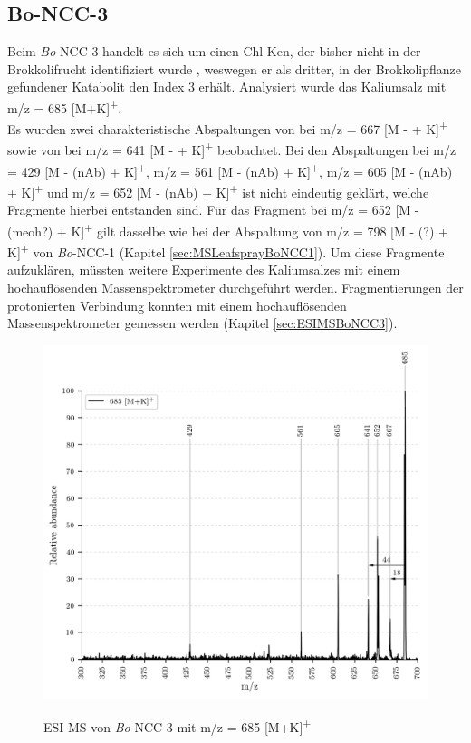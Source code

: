 \subsection{Bo-NCC-3}

Beim \textit{Bo}-NCC-3 handelt es sich um einen \gls{Chl-K}en, der bisher nicht in der Brokkolifrucht identifiziert wurde \cite{ChlorophyllCatabolitesBroccoli}, weswegen er als dritter, in der Brokkolipflanze gefundener Katabolit den Index 3 erhält. Analysiert wurde das Kaliumsalz mit m/z = 685 [M+K]\textsuperscript{+}. \\

Es wurden zwei charakteristische Abspaltungen von  bei m/z = 667 [M -  + K]\textsuperscript{+} sowie von  bei m/z = 641 [M -  + K]\textsuperscript{+} beobachtet. Bei den Abspaltungen bei m/z = 429 [M - (\gls{nAb}) + K]\textsuperscript{+}, m/z = 561 [M - (\gls{nAb}) + K]\textsuperscript{+}, m/z = 605 [M - (\gls{nAb}) + K]\textsuperscript{+} und m/z = 652 [M - (\gls{nAb}) + K]\textsuperscript{+} ist nicht eindeutig geklärt, welche Fragmente hierbei entstanden sind. Für das Fragment bei m/z = 652 [M - (\gls{meoh}?) + K]\textsuperscript{+} gilt dasselbe wie bei der Abspaltung von m/z = 798 [M - (?) + K]\textsuperscript{+} von \textit{Bo}-NCC-1 (Kapitel \ref{sec:MSLeafsprayBoNCC1}). Um diese Fragmente aufzuklären, müssten weitere Experimente des Kaliumsalzes mit einem hochauflösenden Massenspektrometer durchgeführt werden. Fragmentierungen der protonierten Verbindung konnten mit einem hochauflösenden Massenspektrometer gemessen werden (Kapitel \ref{sec:ESIMSBoNCC3}).

\begin{figure}[htbp]
  \includegraphics[width=\textwidth, height=0.7\textwidth]{figures/Kapitel4/Kataboliten/VWA_MS_LeafSpray_685.png}
  \label{fig:685MKLeafspray}
  
  \caption[ESI-MS von \textit{Bo}-NCC-3, Quelle: Autor]{ESI-MS von \textit{Bo}-NCC-3 mit m/z = 685 [M+K]\textsuperscript{+}}
\end{figure}

